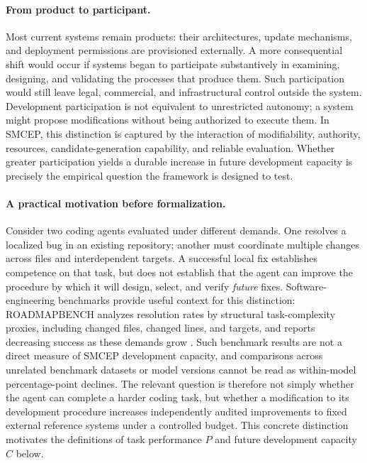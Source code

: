 \documentclass[11pt,a4paper]{article}
\begin{document}
\paragraph{From product to participant.} Most current systems remain products: their architectures, update mechanisms, and deployment permissions are provisioned externally. A more consequential shift would occur if systems began to participate substantively in examining, designing, and validating the processes that produce them. Such participation would still leave legal, commercial, and infrastructural control outside the system. Development participation is not equivalent to unrestricted autonomy; a system might propose modifications without being authorized to execute them. In SMCEP, this distinction is captured by the interaction of modifiability, authority, resources, candidate-generation capability, and reliable evaluation. Whether greater participation yields a durable increase in future development capacity is precisely the empirical question the framework is designed to test.

\paragraph{A practical motivation before formalization.}
Consider two coding agents evaluated under different demands. One resolves a localized bug in an existing repository; another must coordinate multiple changes across files and interdependent targets. A successful local fix establishes competence on that task, but does not establish that the agent can improve the procedure by which it will design, select, and verify \emph{future} fixes. Software-engineering benchmarks provide useful context for this distinction: ROADMAPBENCH analyzes resolution rates by structural task-complexity proxies, including changed files, changed lines, and targets, and reports decreasing success as these demands grow \cite{xu2026roadmapbench}. Such benchmark results are not a direct measure of SMCEP development capacity, and comparisons across unrelated benchmark datasets or model versions cannot be read as within-model percentage-point declines. The relevant question is therefore not simply whether the agent can complete a harder coding task, but whether a modification to its development procedure increases independently audited improvements to fixed external reference systems under a controlled budget. This concrete distinction motivates the definitions of task performance $P$ and future development capacity $C$ below.
\end{document}

